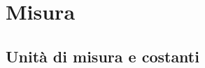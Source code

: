 \documentclass[a4paper,11pt,italian]{article}
\begin{document}
\newpage
\section{Misura}

\subsection{Unità di misura e costanti}

\begin{description}
%  
%  

\end{description}
\end{document}
